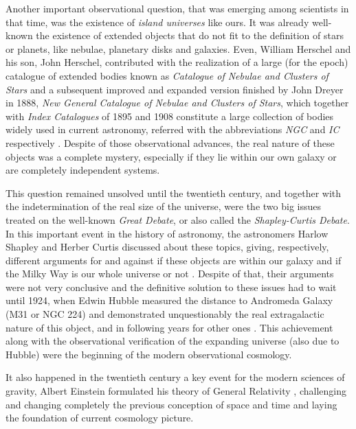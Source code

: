 Another important observational question, that was emerging among 
scientists in that time, was the existence of \textit{island universes} 
like ours. It was already well-known the existence of extended objects 
that do not fit to the definition of stars or planets, like nebulae, 
planetary disks and galaxies. Even, William Herschel and his son, John 
Herschel, contributed with the realization of a large (for the epoch) 
catalogue of extended bodies known as \textit{Catalogue of Nebulae and 
Clusters of Stars} and a subsequent improved and expanded version finished 
by John Dreyer in 1888, \textit{New General Catalogue of Nebulae and 
Clusters of Stars}, which together with \textit{Index Catalogues} of 1895 
and 1908 constitute a large collection of bodies widely used in current 
astronomy, referred with the abbreviations \textit{NGC} and \textit{IC} 
respectively \cite{longair2008}. Despite of those observational advances, 
the real nature of these objects was a complete mystery, especially if they 
lie within our own galaxy or are completely independent systems. 


This question remained unsolved until the twentieth century, and together 
with the indetermination of the real size of the universe, were the two 
big issues treated on the well-known \textit{Great Debate}, or also called 
the \textit{Shapley-Curtis Debate}. In this important event in the history 
of astronomy, the astronomers Harlow Shapley and Herber Curtis discussed 
about these topics, giving, respectively, different arguments for and 
against if these objects are within our galaxy and if the Milky Way is our 
whole universe or not \cite{Curtis1921} \cite{Shapley1921}. Despite of 
that, their arguments were not very conclusive and the definitive solution 
to these issues had to wait until 1924, when Edwin Hubble measured the 
distance to Andromeda Galaxy (M31 or NGC 224) and demonstrated 
unquestionably the real extragalactic nature of this object, and in 
following years for other ones \cite{Hubble1926}. This achievement along 
with the observational verification of the expanding universe (also due to 
Hubble) were the beginning of the modern observational cosmology.


It also happened in the twentieth century a key event for the modern 
sciences of gravity, Albert Einstein formulated his theory of General 
Relativity \cite{Einstein1916}, challenging and changing completely the 
previous conception of space and time and laying the foundation of current 
cosmology picture.


